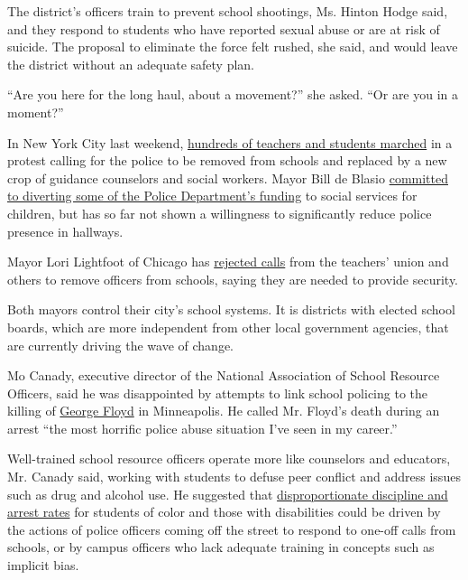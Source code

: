 The district's officers train to prevent school shootings, Ms. Hinton
Hodge said, and they respond to students who have reported sexual abuse
or are at risk of suicide. The proposal to eliminate the force felt
rushed, she said, and would leave the district without an adequate
safety plan.

``Are you here for the long haul, about a movement?'' she asked. ``Or
are you in a moment?''

In New York City last weekend,
\href{https://twitter.com/madinatoure/status/1269278624009551874}{hundreds
of teachers and students marched} in a protest calling for the police to
be removed from schools and replaced by a new crop of guidance
counselors and social workers. Mayor Bill de Blasio
\href{https://www.nytimes3xbfgragh.onion/2020/06/07/nyregion/deblasio-nypd-funding.html}{committed
to diverting some of the Police Department's funding} to social services
for children, but has so far not shown a willingness to significantly
reduce police presence in hallways.

Mayor Lori Lightfoot of Chicago has
\href{https://news.wttw.com/2020/06/05/lightfoot-rules-out-removing-police-officers-chicago-schools\#:~:text=Mayor\%20Lori\%20Lightfoot\%20will\%20not,can\%20negatively\%20impact\%20their\%20learning.}{rejected
calls} from the teachers' union and others to remove officers from
schools, saying they are needed to provide security.

Both mayors control their city's school systems. It is districts with
elected school boards, which are more independent from other local
government agencies, that are currently driving the wave of change.

Mo Canady, executive director of the National Association of School
Resource Officers, said he was disappointed by attempts to link school
policing to the killing of
\href{https://www.nytimes3xbfgragh.onion/article/george-floyd-who-is.html}{George
Floyd} in Minneapolis. He called Mr. Floyd's death during an arrest
``the most horrific police abuse situation I've seen in my career.''

Well-trained school resource officers operate more like counselors and
educators, Mr. Canady said, working with students to defuse peer
conflict and address issues such as drug and alcohol use. He suggested
that
\href{http://www.justicepolicy.org/uploads/justicepolicy/documents/educationunderarrest_fullreport.pdf}{disproportionate
discipline and arrest rates} for students of color and those with
disabilities could be driven by the actions of police officers coming
off the street to respond to one-off calls from schools, or by campus
officers who lack adequate training in concepts such as implicit bias.

